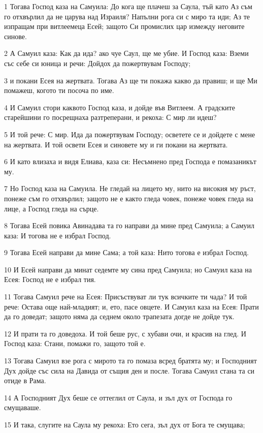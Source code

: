 \par 1 Тогава Господ каза на Самуила: До кога ще плачеш за Саула, тъй като Аз съм го отхвърлил да не царува над Израиля? Напълни рога си с миро та иди; Аз те изпращам при витлеемеца Есей; защото Си промислих цар измежду неговите синове.
\par 2 А Самуил каза: Как да ида? ако чуе Саул, ще ме убие. И Господ каза: Вземи със себе си юница и речи: Дойдох да пожертвувам Господу;
\par 3 и покани Есея на жертвата. Тогава Аз ще ти покажа какво да правиш; и ще Ми помажеш, когото ти посоча по име.
\par 4 И Самуил стори каквото Господ каза, и дойде във Витлеем. А градските старейшини го посрещнаха разтреперани, и рекоха: С мир ли идеш?
\par 5 И той рече: С мир. Ида да пожертвувам Господу; осветете се и дойдете с мене на жертвата. И той освети Есея и синовете му и ги покани на жертвата.
\par 6 И като влизаха и видя Елиава, каза си: Несъмнено пред Господа е помазаникът му.
\par 7 Но Господ каза на Самуила. Не гледай на лицето му, нито на високия му ръст, понеже съм го отхвърлил; защото не е както гледа човек, понеже човек гледа на лице, а Господ гледа на сърце.
\par 8 Тогава Есей повика Авинадава та го направи да мине пред Самуила; а Самуил каза: И тогова не е избрал Господ.
\par 9 Тогава Есей направи да мине Сама; а той каза: Нито тогова е избрал Господ.
\par 10 И Есей направи да минат седемте му сина пред Самуила; но Самуил каза на Есея: Господ не е избрал тия.
\par 11 Тогава Самуил рече на Есея: Присъствуват ли тук всичките ти чада? И той рече: Остава още най-младият; и, ето, пасе овцете. И Самуил каза на Есея: Прати да го доведат; защото няма да седнем около трапезата догде не дойде тук.
\par 12 И прати та го доведоха. И той беше рус, с хубави очи, и красив на глед. И Господ каза: Стани, помажи го, защото той е.
\par 13 Тогава Самуил взе рога с мирото та го помаза всред братята му; и Господният Дух дойде със сила на Давида от същия ден и после. Тогава Самуил стана та си отиде в Рама.
\par 14 А Господният Дух беше се оттеглил от Саула, и зъл дух от Господа го смущаваше.
\par 15 И така, слугите на Саула му рекоха: Ето сега, зъл дух от Бога те смущава;
